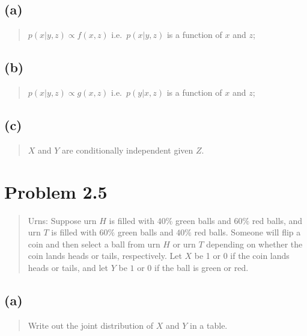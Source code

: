 \documentclass[
  letterpaper,
  DIV=11,
  numbers=noendperiod]{scrreprt}
\begin{document}
\hypertarget{a-2}{%
\subsection{(a)}\label{a-2}}

\begin{quote}
\(p(x|y,z) \propto f(x,z)\) i.e.~\(p(x|y,z)\) is a function of \(x\) and
\(z\);
\end{quote}

\hypertarget{b-2}{%
\subsection{(b)}\label{b-2}}

\begin{quote}
\(p(x|y,z) \propto g(x,z)\) i.e.~\(p(y|x,z)\) is a function of \(x\) and
\(z\);
\end{quote}

\hypertarget{c-1}{%
\subsection{(c)}\label{c-1}}

\begin{quote}
\(X\) and \(Y\) are conditionally independent given \(Z\).
\end{quote}

\hypertarget{problem-2.5}{%
\section{Problem 2.5}\label{problem-2.5}}

\begin{quote}
Urns: Suppose urn \(H\) is filled with \(40\%\) green balls and \(60\%\)
red balls, and urn \(T\) is filled with \(60\%\) green balls and
\(40\%\) red balls. Someone will flip a coin and then select a ball from
urn \(H\) or urn \(T\) depending on whether the coin lands heads or
tails, respectively. Let \(X\) be 1 or 0 if the coin lands heads or
tails, and let \(Y\) be \(1\) or \(0\) if the ball is green or red.
\end{quote}

\hypertarget{a-3}{%
\subsection{(a)}\label{a-3}}

\begin{quote}
Write out the joint distribution of \(X\) and \(Y\) in a table.
\end{quote}
\end{document}
